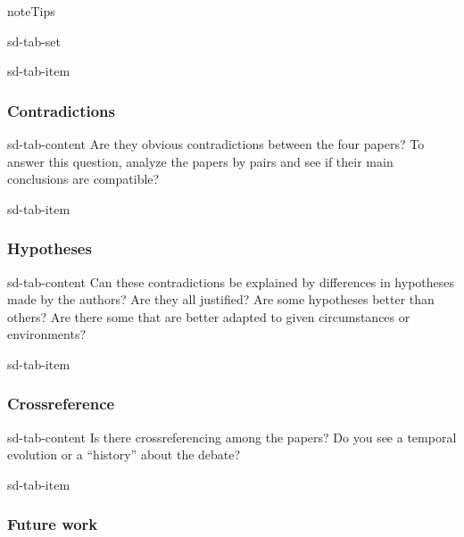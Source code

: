 \documentclass[letterpaper,10pt,english]{jupyterBook}
\begin{document}
\begin{sphinxadmonition}{note}{Tips}

\begin{sphinxuseclass}{sd-tab-set}
\begin{sphinxuseclass}{sd-tab-item}\subsubsection*{Contradictions}

\begin{sphinxuseclass}{sd-tab-content}
\sphinxAtStartPar
Are they obvious contradictions between the four papers? To answer this question, analyze the papers by pairs and see if their main conclusions are compatible?

\end{sphinxuseclass}
\end{sphinxuseclass}
\begin{sphinxuseclass}{sd-tab-item}\subsubsection*{Hypotheses}

\begin{sphinxuseclass}{sd-tab-content}
\sphinxAtStartPar
Can these contradictions be explained by differences in hypotheses made by the authors? Are they all justified? Are some hypotheses better than others? Are there some that are better adapted to given circumstances or environments?

\end{sphinxuseclass}
\end{sphinxuseclass}
\begin{sphinxuseclass}{sd-tab-item}\subsubsection*{Cross\sphinxhyphen{}reference}

\begin{sphinxuseclass}{sd-tab-content}
\sphinxAtStartPar
Is there cross\sphinxhyphen{}referencing among the papers? Do you see a temporal evolution or a “history” about the debate?

\end{sphinxuseclass}
\end{sphinxuseclass}
\begin{sphinxuseclass}{sd-tab-item}\subsubsection*{Future work}


\end{sphinxuseclass}
\end{sphinxuseclass}
\end{sphinxadmonition}
\end{document}

